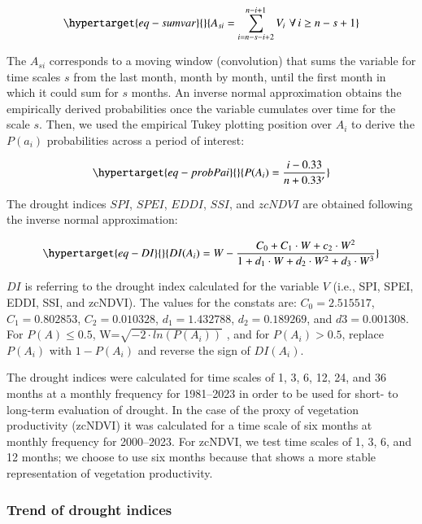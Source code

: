\documentclass[
  authoryear,
  preprint,
  3p,
  onecolumn]{elsarticle}
\begin{document}
\begin{equation}\protect\hypertarget{eq-sumvar}{}{A_{si} = \sum_{i=n-s-i+2}^{n-i+1} V_i\,\, \forall\, i\geq n-s+1  }\label{eq-sumvar}\end{equation}

The \(A_{si}\) corresponds to a moving window (convolution) that sums
the variable for time scales \(s\) from the last month, month by month,
until the first month in which it could sum for \(s\) months. An inverse
normal approximation \citep{Abramowitz1968} obtains the empirically
derived probabilities once the variable cumulates over time for the
scale \(s\). Then, we used the empirical Tukey plotting position
\citep{Wilks2011} over \(A_i\) to derive the \(P(a_i)\) probabilities
across a period of interest:

\begin{equation}\protect\hypertarget{eq-probPai}{}{P(A_i) = \frac{i-0.33}{n+0.33'}}\label{eq-probPai}\end{equation}

The drought indices \(SPI\), \(SPEI\), \(EDDI\), \(SSI\), and \(zcNDVI\)
are obtained following the inverse normal approximation:

\begin{equation}\protect\hypertarget{eq-DI}{}{DI(A_i) = W - \frac{C_0+C_1\cdot W + c_2 \cdot W^2}{1+d_1\cdot W +d_2\cdot W^2 +d_3\cdot W^3}}\label{eq-DI}\end{equation}

\(DI\) is referring to the drought index calculated for the variable
\(V\) (i.e., SPI, SPEI, EDDI, SSI, and zcNDVI). The values for the
constats are: \(C_0 = 2.515517\), \(C_1 = 0.802853\),
\(C_2 = 0.010328\), \(d_1 = 1.432788\), \(d_2 = 0.189269\), and
\(d3 = 0.001308\). For \(P(A) \leq 0.5\),
W=\(\sqrt{-2\cdot ln(P(A_i))}\) , and for \(P(A_i) > 0.5\), replace
\(P(A_i)\) with \(1-P(A_i)\) and reverse the sign of \(DI(A_i)\).

The drought indices were calculated for time scales of 1, 3, 6, 12, 24,
and 36 months at a monthly frequency for 1981--2023 in order to be used
for short- to long-term evaluation of drought. In the case of the proxy
of vegetation productivity (zcNDVI) it was calculated for a time scale
of six months at monthly frequency for 2000--2023. For zcNDVI, we test
time scales of 1, 3, 6, and 12 months; we choose to use six months
because that shows a more stable representation of vegetation
productivity.

\hypertarget{trend-of-drought-indices}{%
\subsubsection{Trend of drought
indices}\label{trend-of-drought-indices}}
\end{document}
